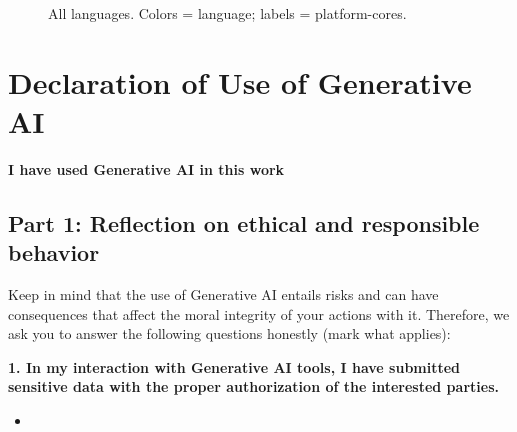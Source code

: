     \hypertarget{fig:conclusion-scatter-all}{} %
\begin{figure}[h]
    \centering
    \caption{All languages. Colors = language; labels = platform-cores.}
\end{figure}

\chapter{Declaration of Use of Generative AI}

\textbf{I have used Generative AI in this work} \quad {}

\section*{Part 1: Reflection on ethical and responsible behavior}

Keep in mind that the use of Generative AI entails risks and can have consequences that affect the moral integrity of your actions with it. Therefore, we ask you to answer the following questions honestly (mark what applies):

\textbf{1. In my interaction with Generative AI tools, I have submitted sensitive data with the proper authorization of the interested parties.}
\begin{itemize}
  \item[] 
\end{itemize}

